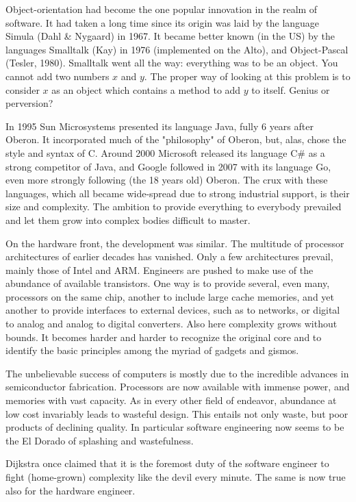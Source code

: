 Object-orientation had become the one popular innovation in the realm of software.
It had taken a long time since its origin was laid by the language Simula (Dahl \&
Nygaard) in 1967. It became better known (in the US) by the languages Smalltalk
(Kay) in 1976 (implemented on the Alto), and Object-Pascal (Tesler, 1980).
Smalltalk went all the way: everything was to be an object. You cannot add two
numbers $x$ and $y$. The proper way of looking at this problem is to consider $x$
as an object which contains a method to add $y$ to itself. Genius or perversion?

In 1995 Sun Microsystems presented its language Java, fully 6 years after Oberon.
It incorporated much of the "philosophy" of Oberon, but, alas, chose the style and
syntax of C. Around 2000 Microsoft released its language C\# as a strong competitor
of Java, and Google followed in 2007 with its language Go, even more strongly
following (the 18 years old) Oberon. The crux with these languages, which all became
wide-spread due to strong industrial support, is their size and complexity. The
ambition to provide everything to everybody prevailed and let them grow into complex
bodies difficult to master.

On the hardware front, the development was similar. The multitude of processor
architectures of earlier decades has vanished. Only a few architectures prevail,
mainly those of Intel and ARM. Engineers are pushed to make use of the abundance of
available transistors. One way is to provide several, even many, processors on the
same chip, another to include large cache memories, and yet another to provide
interfaces to external devices, such as to networks, or digital to analog and analog
to digital converters. Also here complexity grows without bounds. It becomes harder
and harder to recognize the original core and to identify the basic principles among
the myriad of gadgets and gismos.

The unbelievable success of computers is mostly due to the incredible advances in
semiconductor fabrication. Processors are now available with immense power, and
memories with vast capacity. As in every other field of endeavor, abundance at low
cost invariably leads to wasteful design. This entails not only waste, but poor
products of declining quality. In particular software engineering now seems to be
the El Dorado of splashing and wastefulness.

Dijkstra once claimed that it is the foremost duty of the software engineer to fight
(home-grown) complexity like the devil every minute. The same is now true also for
the hardware engineer.
